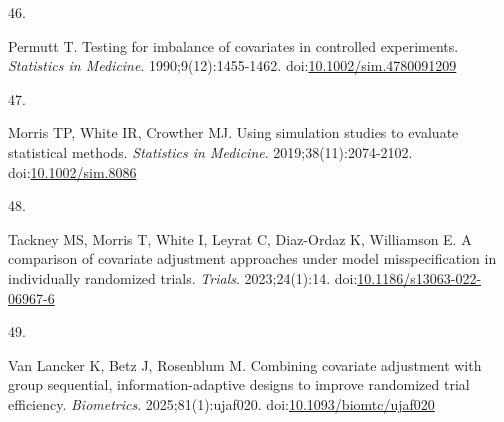 \documentclass[
  11pt,
]{article}
\newlength{\cslhangindent}
\newlength{\csllabelwidth}
\newenvironment{CSLReferences}[2] %
 {\begin{list}{}{%
  \setlength{\itemindent}{0pt}
  \setlength{\leftmargin}{0pt}
  \setlength{\parsep}{0pt}
  \ifodd #1
   \setlength{\leftmargin}{\cslhangindent}
   \setlength{\itemindent}{-1\cslhangindent}
  \fi
  \setlength{\itemsep}{#2\baselineskip}}}
 {\end{list}}
\newcommand{\CSLLeftMargin}[1]{\parbox[t]{\csllabelwidth}{\strut#1\strut}}
\newcommand{\CSLRightInline}[1]{\parbox[t]{\linewidth - \csllabelwidth}{\strut#1\strut}}
\begin{document}
\begin{CSLReferences}{0}{1}
\CSLLeftMargin{46. }%
\CSLRightInline{Permutt T. Testing for imbalance of covariates in controlled experiments. \emph{Statistics in Medicine}. 1990;9(12):1455-1462. doi:\href{https://doi.org/10.1002/sim.4780091209}{10.1002/sim.4780091209}}

\CSLLeftMargin{47. }%
\CSLRightInline{Morris TP, White IR, Crowther MJ. Using simulation studies to evaluate statistical methods. \emph{Statistics in Medicine}. 2019;38(11):2074-2102. doi:\href{https://doi.org/10.1002/sim.8086}{10.1002/sim.8086}}

\CSLLeftMargin{48. }%
\CSLRightInline{Tackney MS, Morris T, White I, Leyrat C, Diaz-Ordaz K, Williamson E. A comparison of covariate adjustment approaches under model misspecification in individually randomized trials. \emph{Trials}. 2023;24(1):14. doi:\href{https://doi.org/10.1186/s13063-022-06967-6}{10.1186/s13063-022-06967-6}}

\CSLLeftMargin{49. }%
\CSLRightInline{Van Lancker K, Betz J, Rosenblum M. Combining covariate adjustment with group sequential, information-adaptive designs to improve randomized trial efficiency. \emph{Biometrics}. 2025;81(1):ujaf020. doi:\href{https://doi.org/10.1093/biomtc/ujaf020}{10.1093/biomtc/ujaf020}}

\end{CSLReferences}
\end{document}
